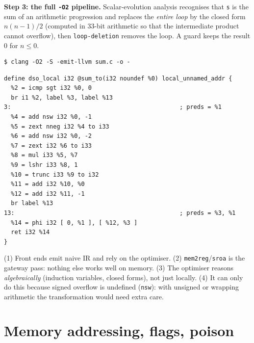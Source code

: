 \documentclass[10pt,a4paper,openany,oneside]{report}
\newcommand{\prio}[1]{\texorpdfstring{\ifcase#1\or{\color{gold}\ding{72}}\or{\color{gold}\ding{72}\ding{72}}\or{\color{gold}\ding{72}\ding{72}\ding{72}}\fi}{}}
\begin{document}
\textbf{Step 3: the full \texttt{-O2} pipeline.} Scalar-evolution analysis recognises that \texttt{s} is the sum of an arithmetic progression and replaces the \emph{entire loop} by the closed form $n(n-1)/2$ (computed in 33-bit arithmetic so that the intermediate product cannot overflow), then \texttt{loop-deletion} removes the loop. A guard keeps the result 0 for $n\le0$.
\begin{lstlisting}[style=shcmd]
$ clang -O2 -S -emit-llvm sum.c -o -
\end{lstlisting}
\begin{lstlisting}[language={LLVMIR},style=out]
define dso_local i32 @sum_to(i32 noundef %0) local_unnamed_addr {
  %2 = icmp sgt i32 %0, 0
  br i1 %2, label %3, label %13
3:                                                ; preds = %1
  %4 = add nsw i32 %0, -1
  %5 = zext nneg i32 %4 to i33
  %6 = add nsw i32 %0, -2
  %7 = zext i32 %6 to i33
  %8 = mul i33 %5, %7
  %9 = lshr i33 %8, 1
  %10 = trunc i33 %9 to i32
  %11 = add i32 %10, %0
  %12 = add i32 %11, -1
  br label %13
13:                                               ; preds = %3, %1
  %14 = phi i32 [ 0, %1 ], [ %12, %3 ]
  ret i32 %14
}
\end{lstlisting}
\begin{tipbox}
(1) Front ends emit naive IR and rely on the optimiser. (2) \texttt{mem2reg}/\texttt{sroa} is the gateway pass: nothing else works well on memory. (3) The optimiser reasons \emph{algebraically} (induction variables, closed forms), not just locally. (4) It can only do this because signed overflow is undefined (\texttt{nsw}): with unsigned or wrapping arithmetic the transformation would need extra care.
\end{tipbox}

\section{Memory addressing, flags, poison \prio{3}}
\end{document}
